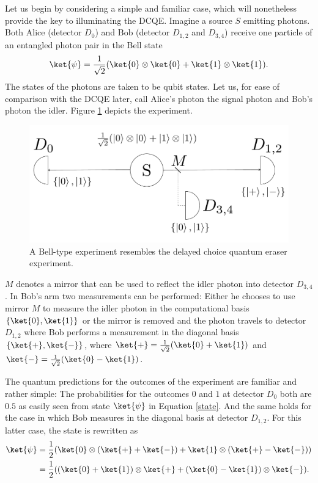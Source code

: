 \documentclass[12pt]{article}
\numberwithin{equation}{section}
\begin{document}
Let us begin by considering a simple and familiar case, which will nonetheless provide the key to illuminating the DCQE. Imagine a source $S$ emitting photons. Both Alice (detector $D_0$) and Bob (detector $D_{1,2}$ and $D_{3,4}$) receive one particle of an entangled photon pair in the Bell state
\begin{equation}
\label{state}
\ket{\psi}=\frac{1}{\sqrt{2}}(\ket{0}\otimes\ket{0}+\ket{1}\otimes\ket{1}).
\end{equation} 
The states of the photons are taken to be qubit states. Let us, for ease of comparison with the DCQE later, call Alice's photon the signal photon and Bob's photon the idler. Figure \ref{fig:BellD} depicts the experiment.
\begin{figure}[H]
\centering
\includegraphics[width=0.7\linewidth]{./BellD.pdf}
\caption{A Bell-type experiment resembles the delayed choice quantum eraser experiment.}
\label{fig:BellD}
\end{figure}

$M$ denotes a mirror that can be used to reflect the idler photon into detector $D_{3,4}$. In Bob's arm two measurements can be performed: Either he chooses to use mirror $M$ to measure the idler photon in the computational basis $\{\ket{0},\ket{1}\}$ or the mirror is removed and the photon travels to detector $D_{1,2}$ where Bob performs a measurement in the diagonal basis  $\{\ket{+},\ket{-}\}$, where $\ket{+}=\frac{1}{\sqrt{2}}(\ket{0}+\ket{1})$ and $\ket{-}=\frac{1}{\sqrt{2}}(\ket{0}-\ket{1})$. 

The quantum predictions for the outcomes of the experiment are familiar and rather simple: The probabilities for the outcomes $0$ and $1$ at detector $D_0$ both are $0.5$ as easily seen from state $\ket{\psi}$ in Equation \ref{state}. And the same holds for the case in which Bob measures in the diagonal basis at detector $D_{1,2}$. For this latter case, the state is rewritten as   
\begin{align}
\label{eraser state}
\ket{\psi} &=\frac{1}{2}(\ket{0}\otimes(\ket{+}+\ket{-})+\ket{1}\otimes(\ket{+}-\ket{-})) \nonumber\\
& =
\frac{1}{2}((\ket{0}+\ket{1})\otimes\ket{+}+(\ket{0}-\ket{1})\otimes\ket{-}).
\end{align}
\end{document}
